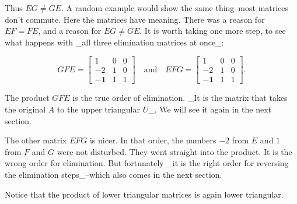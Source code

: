 Thus \(EG\neq GE\). A random example would show the same thing--most matrices don't commute. Here the matrices have meaning. There was a reason for \(EF=FE\), and a reason for \(EG\neq GE\). It is worth taking one more step, to see what happens with _all three elimination matrices at once_:

\[GFE=\begin{bmatrix}1&0&0\\ -2&1&0\\ -\mathbf{1}&1&1\end{bmatrix}\quad\text{and}\quad EFG=\begin{bmatrix}1&0&0\\ -2&1&0\\ -\mathbf{1}&1&1\end{bmatrix}.\]

The product \(GFE\) is the true order of elimination. _It is the matrix that takes the original \(A\) to the upper triangular \(U\)_. We will see it again in the next section.

The other matrix \(EFG\) is nicer. In that order, the numbers \(-2\) from \(E\) and \(1\) from \(F\) and \(G\) were not disturbed. They went straight into the product. It is the wrong order for elimination. But fortunately _it is the right order for reversing the elimination steps_--which also comes in the next section.

Notice that the product of lower triangular matrices is again lower triangular.

 